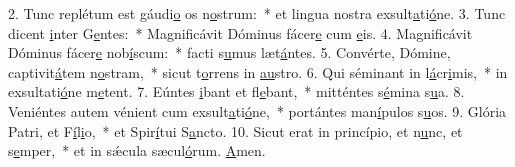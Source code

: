 2. Tunc replétum est gáudi\uline{o} os n\uline{o}strum:~* et lingua nostra exsult\uline{a}ti\uline{ó}ne.
3. Tunc dicent \uline{i}nter G\uline{e}ntes:~* Magnificávit Dóminus fácer\uline{e} cum \uline{e}is.
4. Magnificávit Dóminus fácer\uline{e} nob\uline{í}scum:~* facti s\uline{u}mus læt\uline{á}ntes.
5. Convérte, Dómine, captivit\uline{á}tem n\uline{o}stram,~* sicut t\uline{o}rrens in \uline{au}stro.
6. Qui séminant in l\uline{á}cr\uline{i}mis,~* in exsultati\uline{ó}ne m\uline{e}tent.
7. Eúntes \uline{i}bant et fl\uline{e}bant,~* mitténtes s\uline{é}mina s\uline{u}a.
8. Veniéntes autem vénient cum exsult\uline{a}ti\uline{ó}ne,~* portántes man\uline{í}pulos s\uline{u}os.
9. Glória Patri, et F\uline{í}l\uline{i}o,~* et Spir\uline{í}tui S\uline{a}ncto.
10. Sicut erat in princípio, et n\uline{u}nc, et s\uline{e}mper,~* et in sǽcula sæcul\uline{ó}rum. \uline{A}men.
